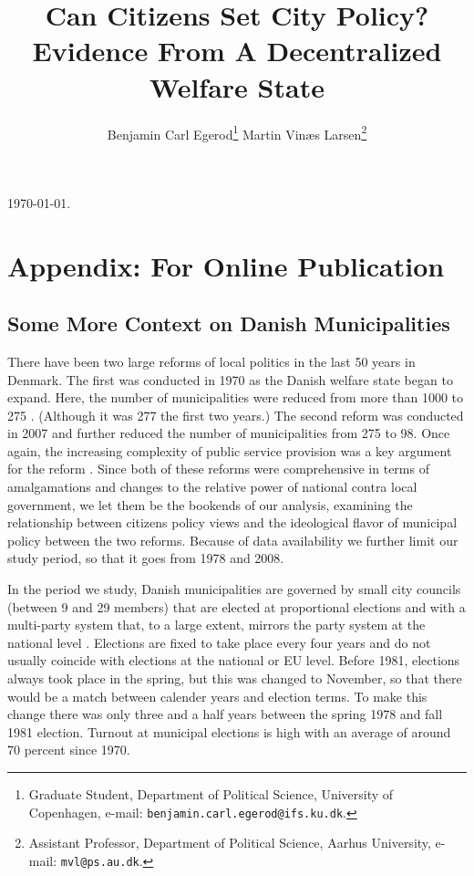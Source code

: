 \documentclass[a4paper,12pt]{article}
\title{\bigskip \bigskip \sffamily \LARGE{Can Citizens Set City Policy?} \\ \Large{ Evidence From A Decentralized Welfare State}}
\author{\bigskip Benjamin Carl Egerod\footnote[2]{Graduate Student, Department of Political Science, University of Copenhagen, e-mail: \texttt{benjamin.carl.egerod@ifs.ku.dk}.} \qquad Martin Vinæs Larsen\footnote[3]{Assistant Professor, Department of Political Science, Aarhus University, e-mail: \texttt{mvl@ps.au.dk}.}}
\begin{document}
	
	\begin{footnotesize} \noindent \today. \end{footnotesize} %
	
\onehalfspacing


\renewcommand{\thesubsection}{\Alph{subsection}}
\renewcommand{\thetable}{\Alph{subsection}\arabic{table}}
\renewcommand{\thefigure}{\Alph{subsection}\arabic{figure}}

\section*{Appendix: For Online Publication}

\localtableofcontents

\clearpage


\subsection{Some More Context on Danish Municipalities} 

\setcounter{table}{0}
\setcounter{figure}{0}

\label{context}
There have been two large reforms of local politics in the last 50 years in Denmark. The first was conducted in 1970 as the Danish welfare state began to expand. Here, the number of municipalities were reduced from more than 1000 to 275 \citep{ingvartsen1991kommunalreformen}. (Although it was 277 the first two years.)  The second reform was conducted in 2007 and further reduced the number of municipalities from 275 to 98. Once again, the increasing complexity of public service provision was a key argument for the reform \citep{christiansen2008utaenkelige}. Since both of these reforms were comprehensive in terms of amalgamations and changes to the relative power of national contra local government, we let them be the bookends of our analysis, examining the relationship between citizens policy views and the ideological flavor of municipal policy between the two reforms. Because of data availability we further limit our study period, so that it goes from 1978 and 2008.

In the period we study, Danish municipalities are governed by small city councils (between 9 and 29 members) that are elected at proportional elections and with a multi-party system that, to a large extent, mirrors the party system at the national level \citep{blom2013et}. Elections are fixed to take place every four years and do not usually coincide with elections at the national or EU level. Before 1981, elections always took place in the spring, but this was changed to November, so that there would be a match between calender years and election terms. To make this change there was only three and a half years between the spring 1978 and fall 1981 election. Turnout at municipal elections is high with an average of around 70 percent since 1970.  
\end{document}
